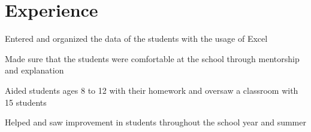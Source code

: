 \section{Experience}

\begin{tightemize}
\item Entered and organized the data of the students with the usage of Excel
\item Made sure that the students were comfortable at the school through mentorship and explanation
\end{tightemize}
\sectionsep


\begin{tightemize}
\item Aided students ages 8 to 12 with their homework and oversaw a classroom with 15 students
\item Helped and saw improvement in students throughout the school year and summer
\end{tightemize}